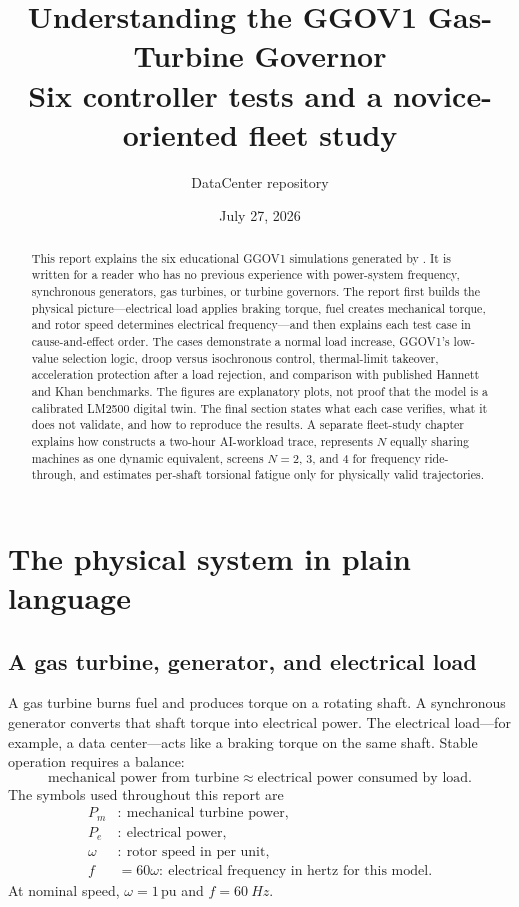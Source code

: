 \documentclass[11pt]{article}
\title{Understanding the GGOV1 Gas-Turbine Governor\\
\large Six controller tests and a novice-oriented fleet study}
\author{DataCenter repository}
\date{July 27, 2026}
\newcommand{\pu}{\,\mathrm{pu}}
\newcommand{\Pe}{\ensuremath{P_{e}}}
\newcommand{\Pm}{\ensuremath{P_{m}}}
\begin{document}
\maketitle

\begin{abstract}
This report explains the six educational GGOV1 simulations generated by
.  It is written for a reader who
has no previous experience with power-system frequency, synchronous
generators, gas turbines, or turbine governors.  The report first builds the
physical picture---electrical load applies braking torque, fuel creates
mechanical torque, and rotor speed determines electrical frequency---and then
explains each test case in cause-and-effect order.  The cases demonstrate a
normal load increase, GGOV1's low-value selection logic, droop versus
isochronous control, thermal-limit takeover, acceleration protection after a
load rejection, and comparison with published Hannett and Khan benchmarks.
The figures are explanatory plots, not proof that the model is a calibrated
LM2500 digital twin.  The final section states what each case verifies, what it
does not validate, and how to reproduce the results.  A separate fleet-study
chapter explains how  constructs a two-hour
AI-workload trace, represents $N$ equally sharing machines as one dynamic
equivalent, screens $N=2$, $3$, and $4$ for frequency ride-through, and
estimates per-shaft torsional fatigue only for physically valid trajectories.
\end{abstract}

\tableofcontents
\clearpage

\section{The physical system in plain language}

\subsection{A gas turbine, generator, and electrical load}
A gas turbine burns fuel and produces torque on a rotating shaft.  A
synchronous generator converts that shaft torque into electrical power.  The
electrical load---for example, a data center---acts like a braking torque on
the same shaft.  Stable operation requires a balance:
\begin{equation}
  \text{mechanical power from turbine} \approx
  \text{electrical power consumed by load}.
\end{equation}
The symbols used throughout this report are
\begin{align}
  \Pm &:\ \text{mechanical turbine power},\\
  \Pe &:\ \text{electrical power},\\
  \omega &:\ \text{rotor speed in per unit},\\
  f &= 60\omega:\ \text{electrical frequency in hertz for this model}.
\end{align}
At nominal speed, $\omega=1\pu$ and $f=\SI{60}{Hz}$.
\end{document}
